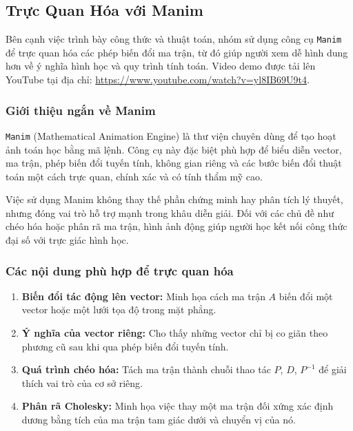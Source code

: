\documentclass[12pt,a4paper]{article}
\begin{document}
\subsection{Trực Quan Hóa với Manim}
Bên cạnh việc trình bày công thức và thuật toán, nhóm sử dụng công cụ \texttt{Manim} để trực quan hóa các phép biến đổi ma trận, từ đó giúp người xem dễ hình dung hơn về ý nghĩa hình học và quy trình tính toán. Video demo được tải lên YouTube tại địa chỉ: \url{https://www.youtube.com/watch?v=yl8IB69U9t4}.

\subsubsection{Giới thiệu ngắn về Manim}

\begin{infobox}[Manim là gì?]
\texttt{Manim} (Mathematical Animation Engine) là thư viện chuyên dùng để tạo hoạt ảnh toán học bằng mã lệnh. Công cụ này đặc biệt phù hợp để biểu diễn vector, ma trận, phép biến đổi tuyến tính, không gian riêng và các bước biến đổi thuật toán một cách trực quan, chính xác và có tính thẩm mỹ cao.\cite{ref7}
\end{infobox}

\noindent Việc sử dụng Manim không thay thế phần chứng minh hay phân tích lý thuyết, nhưng đóng vai trò hỗ trợ mạnh trong khâu diễn giải. Đối với các chủ đề như chéo hóa hoặc phân rã ma trận, hình ảnh động giúp người học kết nối công thức đại số với trực giác hình học.

\subsubsection{Các nội dung phù hợp để trực quan hóa}

\begin{enumerate}[label=\textbf{\alph*)}, leftmargin=*, align=left]
    \item \textbf{Biến đổi tác động lên vector:} Minh họa cách ma trận $A$ biến đổi một vector hoặc một lưới tọa độ trong mặt phẳng.

    \item \textbf{Ý nghĩa của vector riêng:} Cho thấy những vector chỉ bị co giãn theo phương cũ sau khi qua phép biến đổi tuyến tính.

    \item \textbf{Quá trình chéo hóa:} Tách ma trận thành chuỗi thao tác $P$, $D$, $P^{-1}$ để giải thích vai trò của cơ sở riêng.

    \item \textbf{Phân rã Cholesky:} Minh họa việc thay một ma trận đối xứng xác định dương bằng tích của ma trận tam giác dưới và chuyển vị của nó.
\end{enumerate}
\end{document}
